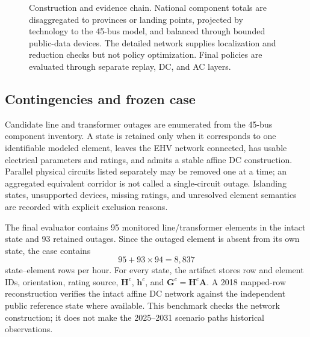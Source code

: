 \documentclass[10pt,journal]{IEEEtran}
\begin{document}
\begin{figure}[t]
{}
\caption{Construction and evidence chain. National component totals are disaggregated to provinces or landing points, projected by technology to the 45-bus model, and balanced through bounded public-data devices. The detailed network supplies localization and reduction checks but not policy optimization. Final policies are evaluated through separate replay, DC, and AC layers.}
\label{fig:case_pipeline}
\end{figure}

\subsection{Contingencies and frozen case}

Candidate line and transformer outages are enumerated from the 45-bus component inventory. A state is retained only when it corresponds to one identifiable modeled element, leaves the EHV network connected, has usable electrical parameters and ratings, and admits a stable affine DC construction. Parallel physical circuits listed separately may be removed one at a time; an aggregated equivalent corridor is not called a single-circuit outage. Islanding states, unsupported devices, missing ratings, and unresolved element semantics are recorded with explicit exclusion reasons.

The final evaluator contains 95 monitored line/transformer elements in the intact state and 93 retained outages. Since the outaged element is absent from its own state, the case contains
\begin{equation}
95+93\times94=8{,}837
\end{equation}
state--element rows per hour. For every state, the artifact stores row and element IDs, orientation, rating source, $\bm H^c$, $\bm h^c$, and $\bm G^c=\bm H^c\bm A$. A 2018 mapped-row reconstruction verifies the intact affine DC network against the independent public reference state where available. This benchmark checks the network construction; it does not make the 2025--2031 scenario paths historical observations.
\end{document}
